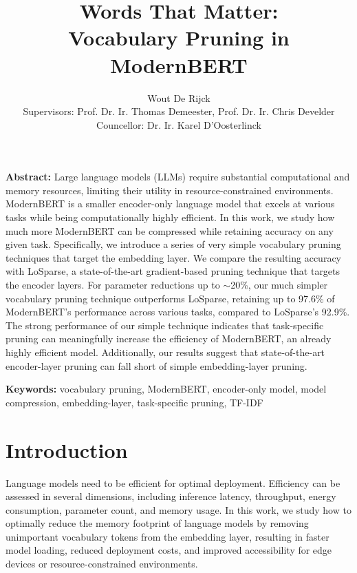 \documentclass[twocolumn]{article}
\title{\vspace{-1.5cm}\huge Words That Matter:\\ Vocabulary Pruning in ModernBERT}
\author{
Wout De Rijck\\[0.5em]
\small{Supervisors:} \normalsize Prof. Dr. Ir. Thomas Demeester, \normalsize Prof. Dr. Ir. Chris Develder\\
\small{Councellor:} \normalsize Dr. Ir. Karel D'Oosterlinck
}
\date{} %
\begin{document}
\maketitle


\textbf{Abstract:} Large language models (LLMs) require substantial computational and memory resources, limiting their utility in resource-constrained environments. 
ModernBERT is a smaller encoder-only language model that excels at various tasks while being computationally highly efficient. 
In this work, we study how much more ModernBERT can be compressed while retaining accuracy on any given task.
Specifically, we introduce a series of very simple vocabulary pruning techniques that target the embedding layer. We compare the resulting accuracy with LoSparse, a state-of-the-art gradient-based pruning technique that targets the encoder layers.
For parameter reductions up to $\sim$20\%, our much simpler vocabulary pruning technique outperforms LoSparse, retaining up to 97.6\% of ModernBERT's performance across various tasks, compared to LoSparse's 92.9\%.
The strong performance of our simple technique indicates that task-specific pruning can meaningfully increase the efficiency of ModernBERT, an already highly efficient model. Additionally, our results suggest that state-of-the-art encoder-layer pruning can fall short of simple embedding-layer pruning.


\textbf{Keywords:} vocabulary pruning, ModernBERT, encoder-only model, model compression, embedding-layer, task-specific pruning, TF-IDF

\section{Introduction}
Language models need to be efficient for optimal deployment.
Efficiency can be assessed in several dimensions, including inference latency, throughput, energy consumption, parameter count, and memory usage.
In this work, we study how to optimally reduce the memory footprint of language models by removing unimportant vocabulary tokens from the embedding layer, resulting in faster model loading, reduced deployment costs, and improved accessibility for edge devices or resource-constrained environments.
\end{document}
